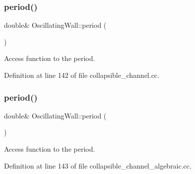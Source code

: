 \mbox{\label{classOscillatingWall_ac3e0098c026e23dd8be8ea29f6a9c101}} 
\subsubsection{\texorpdfstring{period()}{period()}\hspace{0.1cm}{\footnotesize\ttfamily [1/2]}}
{\footnotesize\ttfamily double\& Oscillating\+Wall\+::period (\begin{DoxyParamCaption}{ }\end{DoxyParamCaption})\hspace{0.3cm}{\ttfamily [inline]}}



Access function to the period. 



Definition at line 142 of file collapsible\+\_\+channel.\+cc.

\mbox{\label{classOscillatingWall_ac3e0098c026e23dd8be8ea29f6a9c101}} 
\subsubsection{\texorpdfstring{period()}{period()}\hspace{0.1cm}{\footnotesize\ttfamily [2/2]}}
{\footnotesize\ttfamily double\& Oscillating\+Wall\+::period (\begin{DoxyParamCaption}{ }\end{DoxyParamCaption})\hspace{0.3cm}{\ttfamily [inline]}}



Access function to the period. 



Definition at line 143 of file collapsible\+\_\+channel\+\_\+algebraic.\+cc.

\mbox{\label{classOscillatingWall_abb4ae7e556479d2980a56963bd8d4558}} 
